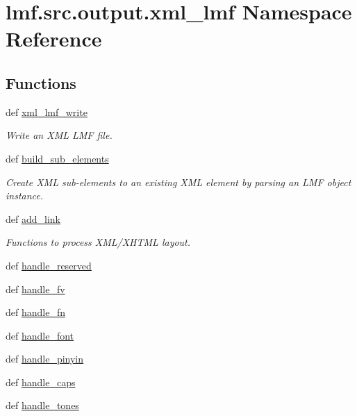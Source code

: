 \hypertarget{namespacelmf_1_1src_1_1output_1_1xml__lmf}{\section{lmf.\+src.\+output.\+xml\+\_\+lmf Namespace Reference}
\label{namespacelmf_1_1src_1_1output_1_1xml__lmf}
}
\subsection*{Functions}
\begin{DoxyCompactItemize}
\item 
def \hyperlink{namespacelmf_1_1src_1_1output_1_1xml__lmf_a1c01a3d8520fa98119babc869ecf36b5}{xml\+\_\+lmf\+\_\+write}
\begin{DoxyCompactList}\small\item\em Write an X\+M\+L L\+M\+F file. \end{DoxyCompactList}\item 
def \hyperlink{namespacelmf_1_1src_1_1output_1_1xml__lmf_a4dcbf9737531170cd9a76a0e65b6c770}{build\+\_\+sub\+\_\+elements}
\begin{DoxyCompactList}\small\item\em Create X\+M\+L sub-\/elements to an existing X\+M\+L element by parsing an L\+M\+F object instance. \end{DoxyCompactList}\item 
def \hyperlink{namespacelmf_1_1src_1_1output_1_1xml__lmf_a1dd2fcec1708971025b470b0902ab2f8}{add\+\_\+link}
\begin{DoxyCompactList}\small\item\em Functions to process X\+M\+L/\+X\+H\+T\+M\+L layout. \end{DoxyCompactList}\item 
def \hyperlink{namespacelmf_1_1src_1_1output_1_1xml__lmf_ae2728b11203c864e813f456021aa2e31}{handle\+\_\+reserved}
\item 
def \hyperlink{namespacelmf_1_1src_1_1output_1_1xml__lmf_a7c74a6c430a895901e2118c612ed9681}{handle\+\_\+fv}
\item 
def \hyperlink{namespacelmf_1_1src_1_1output_1_1xml__lmf_a34fe7d3a9091155a703b80cc0254dc5c}{handle\+\_\+fn}
\item 
def \hyperlink{namespacelmf_1_1src_1_1output_1_1xml__lmf_aa50a22183b0503fd5c81aeae688c4de8}{handle\+\_\+font}
\item 
def \hyperlink{namespacelmf_1_1src_1_1output_1_1xml__lmf_a3d22d49b1f368ffcf27c9d67a4859756}{handle\+\_\+pinyin}
\item 
def \hyperlink{namespacelmf_1_1src_1_1output_1_1xml__lmf_a33382465b3524c3b49269cb00fae62ef}{handle\+\_\+caps}
\item 
def \hyperlink{namespacelmf_1_1src_1_1output_1_1xml__lmf_a12f7fc79f5144d4b80dd9bba74de53f6}{handle\+\_\+tones}
\end{DoxyCompactItemize}


